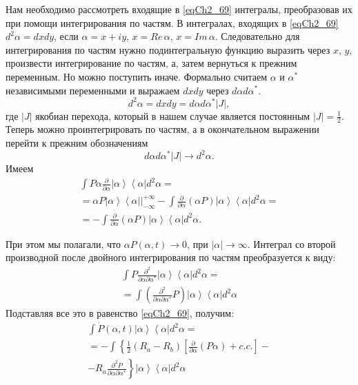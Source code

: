Нам необходимо рассмотреть входящие в \eqref{eqCh2_69} интегралы,
преобразовав их при помощи интегрирования по частям.
В интегралах, входящих в \eqref{eqCh2_69} $d^2\alpha = dx dy$, если
$\alpha = x + i y$, $x = Re\,\alpha$, $x = Im\,\alpha$.
Следовательно для интегрирования по частям нужно подинтегральную
функцию выразить через $x$, $y$, произвести интегрирование по частям,
а, затем вернуться к прежним переменным. Но можно поступить
иначе. Формально считаем $\alpha$ и $\alpha^{*}$ независимыми
переменными и выражаем $dx dy$ через $d\alpha d\alpha^{*}$.
\[
d^2\alpha = dx dy = d\alpha d\alpha^{*} \left|J\right|,
\]
где $\left|J\right|$ якобиан перехода, который в нашем случае является
постоянным $\left|J\right| = \frac{1}{2}$. Теперь можно
проинтегрировать по частям, а в окончательном выражении перейти к
прежним обозначениям 
\[
d\alpha d\alpha^{*} \left|J\right| \rightarrow d^2\alpha.
\]
 Имеем  
\begin{eqnarray}
\int P \alpha \frac{\partial}{\partial \alpha}
\left|\alpha\right>\left<\alpha\right| 
d^2 \alpha = 
\nonumber \\
= \left.\alpha P \left|\alpha\right>\left<\alpha\right|
\right|_{-\infty}^{+\infty} - 
\int \frac{\partial}{\partial \alpha}\left(\alpha P\right)
\left|\alpha\right>\left<\alpha\right|d^2 \alpha = 
\nonumber \\
= 
- \int \frac{\partial}{\partial \alpha}\left(\alpha P\right)
\left|\alpha\right>\left<\alpha\right|d^2 \alpha.
\label{eqCh2_70}
\end{eqnarray}

При этом мы полагали, что $\alpha P\left(\alpha, t\right) \rightarrow
0$, при $\left|\alpha\right| \rightarrow \infty$.  Интеграл со второй
производной после двойного интегрирования по частям преобразуется к
виду: 
\begin{eqnarray}
\int P \frac{\partial^2}{\partial \alpha \partial \alpha^{*}}
\left|\alpha\right>\left<\alpha\right| 
d^2 \alpha = 
\nonumber \\
= \int \left(\frac{\partial^2}{\partial \alpha \partial \alpha^{*}}
P\right) \left|\alpha\right>\left<\alpha\right|  
d^2 \alpha
\label{eqCh2_71}
\end{eqnarray}
Подставляя все это в равенство \eqref{eqCh2_69}, получим:
\begin{eqnarray}
\int \dot{P} \left(\alpha, t\right) 
\left|\alpha\right>\left<\alpha\right| 
d^2 \alpha = 
\nonumber \\
= - \int \left\{
\frac{1}{2}\left(R_a - R_b\right)
\left[
\frac{\partial}{\partial \alpha}
\left(P \alpha\right) + c.c.
\right]
\right.
-
\nonumber \\
- \left.
R_a \frac{\partial^2 P}{\partial \alpha \partial \alpha^{*}}
\right\}
\left|\alpha\right>\left<\alpha\right| 
d^2 \alpha
\label{eqCh2_72}
\end{eqnarray}

